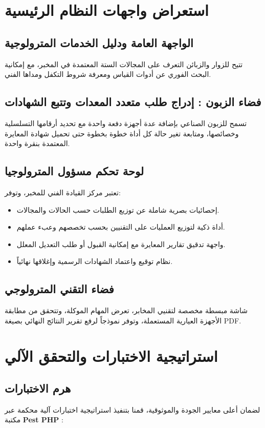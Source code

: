 \documentclass{bts-report-ar}
\begin{document}
\section{استعراض واجهات النظام الرئيسية}
\subsection{الواجهة العامة ودليل الخدمات المترولوجية}
تتيح للزوار والزبائن التعرف على المجالات الستة المعتمدة في المخبر، مع إمكانية البحث الفوري عن أدوات القياس ومعرفة شروط التكفل ومداها الفني.

\subsection{فضاء الزبون : إدراج طلب متعدد المعدات وتتبع الشهادات}
تسمح للزبون الصناعي بإضافة عدة أجهزة دفعة واحدة مع تحديد أرقامها التسلسلية وخصائصها، ومتابعة تغير حالة كل أداة خطوة بخطوة حتى تحميل شهادة المعايرة المعتمدة بنقرة واحدة.

\subsection{لوحة تحكم مسؤول المترولوجيا}
تعتبر مركز القيادة الفني للمخبر، وتوفر:
\begin{itemize}
  \item إحصائيات بصرية شاملة عن توزيع الطلبات حسب الحالات والمجالات.
  \item أداة ذكية لتوزيع العمليات على التقنيين بحسب تخصصهم وعبء عملهم.
  \item واجهة تدقيق تقارير المعايرة مع إمكانية القبول أو طلب التعديل المعلل.
  \item نظام توقيع واعتماد الشهادات الرسمية وإغلاقها نهائياً.
\end{itemize}

\subsection{فضاء التقني المترولوجي}
شاشة مبسطة مخصصة لتقنيي المخابر، تعرض المهام الموكلة، وتتحقق من مطابقة الأجهزة العيارية المستعملة، وتوفر نموذجاً لرفع تقرير النتائج النهائي بصيغة PDF.

\section{استراتيجية الاختبارات والتحقق الآلي}
\subsection{هرم الاختبارات}
لضمان أعلى معايير الجودة والموثوقية، قمنا بتنفيذ استراتيجية اختبارات آلية محكمة عبر مكتبة \textbf{Pest PHP} :
\end{document}
